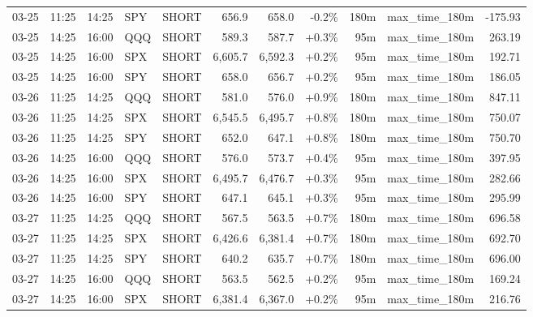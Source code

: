 \documentclass[11pt,a4paper,twoside]{article}
\begin{document}
\begin{center}
\begin{longtable}{>{\color{txtmain}}l l l l l r r r r >{\color{txtmain}}l r}
03-25 & 11:25 & 14:25 & SPY & SHORT & 656.9 & 658.0 & \textcolor{lossred}{-0.2\%} & 180m & max\_time\_180m & \textcolor{lossred}{-175.93} \\
03-25 & 14:25 & 16:00 & QQQ & SHORT & 589.3 & 587.7 & \textcolor{wingreen}{+0.3\%} & 95m & max\_time\_180m & \textcolor{wingreen}{263.19} \\
03-25 & 14:25 & 16:00 & SPX & SHORT & 6,605.7 & 6,592.3 & \textcolor{wingreen}{+0.2\%} & 95m & max\_time\_180m & \textcolor{wingreen}{192.71} \\
03-25 & 14:25 & 16:00 & SPY & SHORT & 658.0 & 656.7 & \textcolor{wingreen}{+0.2\%} & 95m & max\_time\_180m & \textcolor{wingreen}{186.05} \\
03-26 & 11:25 & 14:25 & QQQ & SHORT & 581.0 & 576.0 & \textcolor{wingreen}{+0.9\%} & 180m & max\_time\_180m & \textcolor{wingreen}{847.11} \\
03-26 & 11:25 & 14:25 & SPX & SHORT & 6,545.5 & 6,495.7 & \textcolor{wingreen}{+0.8\%} & 180m & max\_time\_180m & \textcolor{wingreen}{750.07} \\
03-26 & 11:25 & 14:25 & SPY & SHORT & 652.0 & 647.1 & \textcolor{wingreen}{+0.8\%} & 180m & max\_time\_180m & \textcolor{wingreen}{750.70} \\
03-26 & 14:25 & 16:00 & QQQ & SHORT & 576.0 & 573.7 & \textcolor{wingreen}{+0.4\%} & 95m & max\_time\_180m & \textcolor{wingreen}{397.95} \\
03-26 & 14:25 & 16:00 & SPX & SHORT & 6,495.7 & 6,476.7 & \textcolor{wingreen}{+0.3\%} & 95m & max\_time\_180m & \textcolor{wingreen}{282.66} \\
03-26 & 14:25 & 16:00 & SPY & SHORT & 647.1 & 645.1 & \textcolor{wingreen}{+0.3\%} & 95m & max\_time\_180m & \textcolor{wingreen}{295.99} \\
03-27 & 11:25 & 14:25 & QQQ & SHORT & 567.5 & 563.5 & \textcolor{wingreen}{+0.7\%} & 180m & max\_time\_180m & \textcolor{wingreen}{696.58} \\
03-27 & 11:25 & 14:25 & SPX & SHORT & 6,426.6 & 6,381.4 & \textcolor{wingreen}{+0.7\%} & 180m & max\_time\_180m & \textcolor{wingreen}{692.70} \\
03-27 & 11:25 & 14:25 & SPY & SHORT & 640.2 & 635.7 & \textcolor{wingreen}{+0.7\%} & 180m & max\_time\_180m & \textcolor{wingreen}{696.00} \\
03-27 & 14:25 & 16:00 & QQQ & SHORT & 563.5 & 562.5 & \textcolor{wingreen}{+0.2\%} & 95m & max\_time\_180m & \textcolor{wingreen}{169.24} \\
03-27 & 14:25 & 16:00 & SPX & SHORT & 6,381.4 & 6,367.0 & \textcolor{wingreen}{+0.2\%} & 95m & max\_time\_180m & \textcolor{wingreen}{216.76} \\

\end{longtable}
\end{center}
\end{document}
